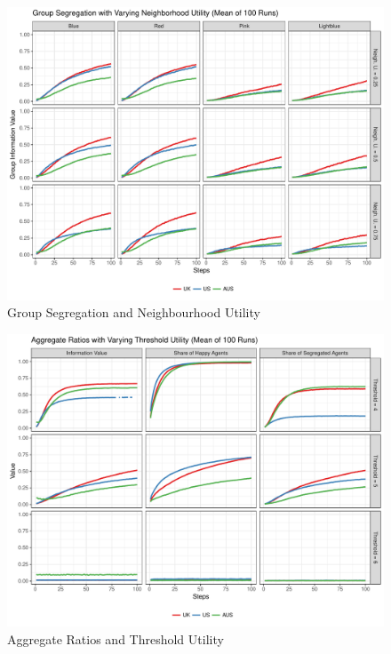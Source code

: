 \documentclass[12pt, a4paper]{article}
\begin{document}
\begin{figure}[bp!]
	\centering
	\caption{Group Segregation and Neighbourhood Utility}
	\includegraphics[scale=0.6]{./Plots/nb_grp_ratios.pdf}
\end{figure}

\begin{figure}[bp!]
	\centering
	\caption{Aggregate Ratios and Threshold Utility}
	\includegraphics[scale=0.6]{./Plots/th_agg_ratios.pdf}
\end{figure}
\end{document}
